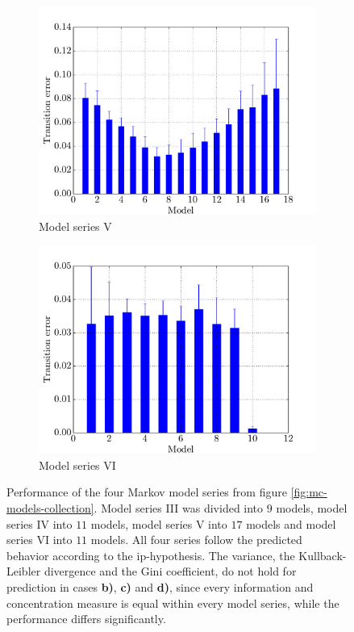 \begin{figure}[p]
\begin{subfigure}{0.48\textwidth}
    	\centering
        \includegraphics[width=\textwidth]{results/mc5_performance_distances}
        \caption{Model series V}
        \label{fig:mc5-performance-distance}
    \end{subfigure}
    \hfill
    \begin{subfigure}{0.48\textwidth}
    	\centering
        \includegraphics[width=\textwidth]{results/mc6_performance_distances}
        \caption{Model series VI}
        \label{fig:mc6-performance-distance}
    \end{subfigure}
    \caption[Performance of four Markov model series]{Performance of the four Markov model series from figure \ref{fig:mc-models-collection}. Model series III was divided into $9$ models, model series IV into $11$ models, model series V into $17$ models and model series VI into $11$ models. All four series follow the predicted behavior according to the \acs{ip}-hypothesis. The variance, the Kullback-Leibler divergence and the Gini coefficient, do not hold for prediction in cases \textbf{b)}, \textbf{c)} and \textbf{d)}, since every information and concentration measure is equal within every model series, while the performance differs significantly.}
    \label{fig:mc-series-performance}
\end{figure}

